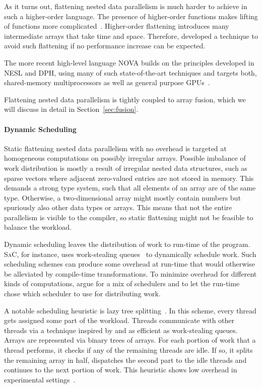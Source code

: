 \documentclass[a4paper]{article}
\newcommand{\sac}{S\textsc{a}C}
\begin{document}
As it turns out, flattening nested data parallelism is much harder to
achieve in such a higher-order language. The presence of higher-order
functions makes lifting of functions more
complicated~\cite{Lippmeier:2012:WEH:2364527.2364564}. Higher-order
flattening introduces many intermediate arrays that take time and
space. Therefore, \citet{Keller:2012:VA:2364506.2364512} developed a
technique to avoid such flattening if no performance increase can be
expected.

The more recent high-level language NOVA builds on the principles
developed in NESL and DPH, using many of such state-of-the-art
techniques and targets both, shared-memory multiprocessors as well as
general purpose GPUs~\cite{Collins:2014:NFL:2627373.2627375}.

Flattening nested data parallelism is tightly coupled to array fusion,
which we will discuss in detail in Section~\ref{sec:fusion}.

\paragraph{Dynamic Scheduling}

Static flattening nested data parallelism with no overhead is targeted
at homogeneous computations on possibly irregular arrays. Possible
imbalance of work distribution is mostly a result of irregular nested
data structures, such as sparse vectors where adjacent zero-valued
entries are not stored in memory. This demands a strong type system,
such that all elements of an array are of the same type. Otherwise, a
two-dimensional array might mostly contain numbers but spuriously also
other data types or arrays. This means that not the entire parallelism
is visible to the compiler, so static flattening might not be feasible
to balance the workload.

Dynamic scheduling leaves the distribution of work to run-time of the
program. \sac{}, for instance, uses work-stealing
queues~\cite{Chase2005Dynamic, Grelck:2007:SOS:1248648.1248654} to
dynamically schedule work. Such scheduling schemes can produce some
overhead at run-time that would otherwise be alleviated by
compile-time transformations. To minimize overhead for different kinds
of computations, \citet{Fluet:2008:SFG:1411204.1411239} argue for a
mix of schedulers and to let the run-time chose which scheduler to use
for distributing work.

A notable scheduling heuristic is lazy tree
splitting~\cite{Bergstrom:2010:LTS:1863543.1863558}. In this scheme,
every thread gets assigned some part of the workload. Threads
communicate with other threads via a technique inspired by and as
efficient as work-stealing queues. Arrays are represented via binary
trees of arrays. For each portion of work that a thread performs, it
checks if any of the remaining threads are idle. If so, it splits the
remaining array in half, dispatches the second part to the idle
threads and continues to the next portion of work. This heuristic
shows low overhead in experimental
settings~\cite{Bergstrom:2010:LTS:1863543.1863558}.
\end{document}

